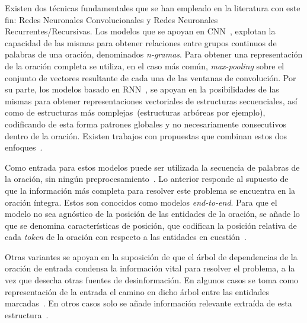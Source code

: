 Existen dos técnicas fundamentales que se han empleado en la literatura con este fin: Redes Neuronales Convolucionales y Redes Neuronales Recurrentes/Recursivas.
Los modelos que se apoyan en CNN~\cite{zeng2014relation, santos2015classifying, nguyen2015relation, xu2015semantic, huang2016attention, wang2016relation}, explotan la capacidad de las mismas para obtener relaciones entre grupos continuos de palabras de una oración, denominados \textit{n-gramas}. 
Para obtener una representación de la oración completa se utiliza, en el caso más común, \textit{max-pooling} sobre el conjunto de vectores resultante de cada una de las ventanas de convolución.
Por su parte, los modelos basado en RNN~\cite{socher2012semantic, xu2015classifying, zhang2015bidirectional, ebrahimi2015chain, xiao2016semantic, lee2019semantic}, se apoyan en la posibilidades de las mismas para obtener representaciones vectoriales de estructuras secuenciales, así como de estructuras más complejas~(estructuras arbóreas por ejemplo), codificando de esta forma patrones globales y no necesariamente consecutivos dentro de la oración.
Existen trabajos con propuestas que combinan estos dos enfoques~\cite{liu2015dependency, nguyen2015combining, cai2016bidirectional}.

Como entrada para estos modelos puede ser utilizada la secuencia de palabras de la oración, sin ningún preprocesamiento~\cite{zeng2014relation, santos2015classifying, nguyen2015relation, huang2016attention, wang2016relation, xiao2016semantic}.
Lo anterior responde al supuesto de que la información más completa para resolver este problema se encuentra en la oración íntegra.
Estos son conocidos como modelos \textit{end-to-end}.
Para que el modelo no sea agnóstico de la posición de las entidades de la oración, se añade lo que se denomina características de posición, que codifican la posición relativa de cada \textit{token} de la oración con respecto a las entidades en cuestión~\cite{zeng2014relation, santos2015classifying, nguyen2015relation, zhang2015bidirectional,nguyen2015combining,huang2016attention, wang2016relation, xiao2016semantic, lee2019semantic}.

Otras variantes se apoyan en la suposición de que el árbol de dependencias de la oración de entrada condensa la información vital para resolver el problema, a la vez que desecha otras fuentes de desinformación.
En algunos casos se toma como representación de la entrada el camino en dicho árbol entre las entidades marcadas~\cite{xu2015classifying, hashimoto2015task, xu2015semantic, liu2015dependency, ebrahimi2015chain}.
En otros casos solo se añade información relevante extraída de esta estructura~\cite{zhang2015bidirectional}.

